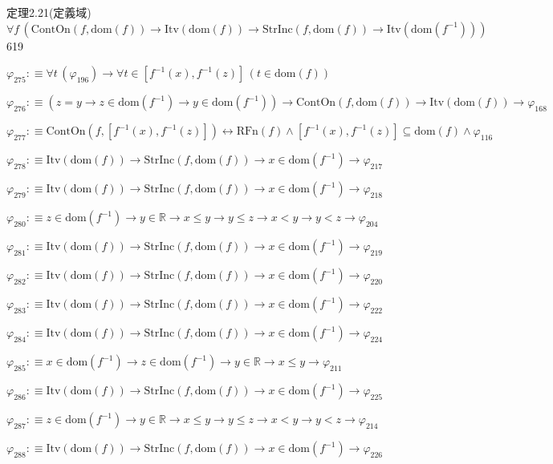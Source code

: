 \begin{fullproof}{定理2.21(定義域)}{$\forall f\,(\mathrm{ContOn}(f,\mathrm{dom}(f)) \to \mathrm{Itv}(\mathrm{dom}(f)) \to \mathrm{StrInc}(f,\mathrm{dom}(f)) \to \mathrm{Itv}(\mathrm{dom}(f^{-1})))$}{619}
\begin{abbrevlist}
\item $\varphi_{275} :\equiv \forall t\,(\varphi_{196}) \to \forall t \in [f^{-1}(x),f^{-1}(z)]\,(t \in \mathrm{dom}(f))$
\item $\varphi_{276} :\equiv (z = y \to z \in \mathrm{dom}(f^{-1}) \to y \in \mathrm{dom}(f^{-1})) \to \mathrm{ContOn}(f,\mathrm{dom}(f)) \to \mathrm{Itv}(\mathrm{dom}(f)) \to \varphi_{168}$
\item $\varphi_{277} :\equiv \mathrm{ContOn}(f,[f^{-1}(x),f^{-1}(z)]) \leftrightarrow \mathrm{RFn}(f) \land [f^{-1}(x),f^{-1}(z)] \subseteq \mathrm{dom}(f) \land \varphi_{116}$
\item $\varphi_{278} :\equiv \mathrm{Itv}(\mathrm{dom}(f)) \to \mathrm{StrInc}(f,\mathrm{dom}(f)) \to x \in \mathrm{dom}(f^{-1}) \to \varphi_{217}$
\item $\varphi_{279} :\equiv \mathrm{Itv}(\mathrm{dom}(f)) \to \mathrm{StrInc}(f,\mathrm{dom}(f)) \to x \in \mathrm{dom}(f^{-1}) \to \varphi_{218}$
\item $\varphi_{280} :\equiv z \in \mathrm{dom}(f^{-1}) \to y \in \mathbb{R} \to x \leq y \to y \leq z \to x < y \to y < z \to \varphi_{204}$
\item $\varphi_{281} :\equiv \mathrm{Itv}(\mathrm{dom}(f)) \to \mathrm{StrInc}(f,\mathrm{dom}(f)) \to x \in \mathrm{dom}(f^{-1}) \to \varphi_{219}$
\item $\varphi_{282} :\equiv \mathrm{Itv}(\mathrm{dom}(f)) \to \mathrm{StrInc}(f,\mathrm{dom}(f)) \to x \in \mathrm{dom}(f^{-1}) \to \varphi_{220}$
\item $\varphi_{283} :\equiv \mathrm{Itv}(\mathrm{dom}(f)) \to \mathrm{StrInc}(f,\mathrm{dom}(f)) \to x \in \mathrm{dom}(f^{-1}) \to \varphi_{222}$
\item $\varphi_{284} :\equiv \mathrm{Itv}(\mathrm{dom}(f)) \to \mathrm{StrInc}(f,\mathrm{dom}(f)) \to x \in \mathrm{dom}(f^{-1}) \to \varphi_{224}$
\item $\varphi_{285} :\equiv x \in \mathrm{dom}(f^{-1}) \to z \in \mathrm{dom}(f^{-1}) \to y \in \mathbb{R} \to x \leq y \to \varphi_{211}$
\item $\varphi_{286} :\equiv \mathrm{Itv}(\mathrm{dom}(f)) \to \mathrm{StrInc}(f,\mathrm{dom}(f)) \to x \in \mathrm{dom}(f^{-1}) \to \varphi_{225}$
\item $\varphi_{287} :\equiv z \in \mathrm{dom}(f^{-1}) \to y \in \mathbb{R} \to x \leq y \to y \leq z \to x < y \to y < z \to \varphi_{214}$
\item $\varphi_{288} :\equiv \mathrm{Itv}(\mathrm{dom}(f)) \to \mathrm{StrInc}(f,\mathrm{dom}(f)) \to x \in \mathrm{dom}(f^{-1}) \to \varphi_{226}$

\end{abbrevlist}
\end{fullproof}
